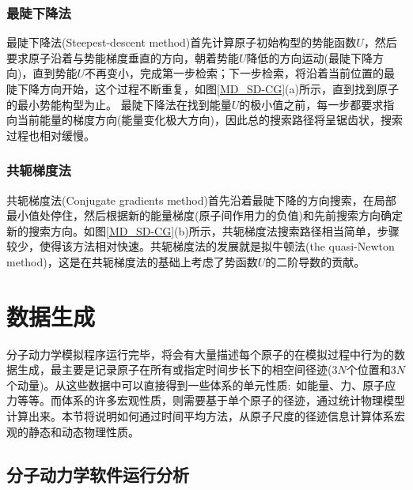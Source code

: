 \subsubsection{最陡下降法}
最陡下降法\textrm{(Steepest-descent method)}首先计算原子初始构型的势能函数$U$，然后要求原子沿着与势能梯度垂直的方向，朝着势能$U$降低的方向运动(最陡下降方向)，直到势能$U$不再变小，完成第一步检索；下一步检索，将沿着当前位置的最陡下降方向开始，这个过程不断重复，如图\ref{MD_SD-CG}\textrm{(a)}所示，直到找到原子的最小势能构型为止。
最陡下降法在找到能量$U$的极小值之前，每一步都要求指向当前能量的梯度方向(能量变化极大方向)，因此总的搜索路径将呈锯齿状，搜索过程也相对缓慢。
\subsubsection{共轭梯度法}
共轭梯度法\textrm{(Conjugate gradients method)}首先沿着最陡下降的方向搜索，在局部最小值处停住，然后根据新的能量梯度(原子间作用力的负值)和先前搜索方向确定新的搜索方向。如图\ref{MD_SD-CG}(b)所示，共轭梯度法搜索路径相当简单，步骤较少，使得该方法相对快速。共轭梯度法的发展就是拟牛顿法\textrm{(the quasi-Newton method)}，这是在共轭梯度法的基础上考虑了势函数$U$的二阶导数的贡献。

\section{数据生成}
分子动力学模拟程序运行完毕，将会有大量描述每个原子的在模拟过程中行为的数据生成，最主要是记录原子在所有或指定时间步长下的相空间径迹(3$N$个位置和3$N$个动量)。从这些数据中可以直接得到一些体系的单元性质:~如能量、力、原子应力等等。而体系的许多宏观性质，则需要基于单个原子的径迹，通过统计物理模型计算出来。本节将说明如何通过时间平均方法，从原子尺度的径迹信息计算体系宏观的静态和动态物理性质。
\subsection{分子动力学软件运行分析}
